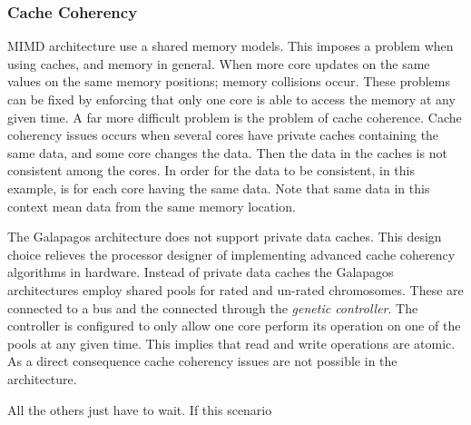 




\subsubsection{Cache Coherency}
MIMD architecture use a shared memory models.
This imposes a problem when using caches, and memory in general.
When more core updates on the same values on the same memory positions; memory collisions occur.
These problems can be fixed by enforcing that only one core is able to access the memory at any given time.
A far more difficult problem is the problem of cache coherence.
Cache coherency issues occurs when several cores have private caches containing the same data, and some core changes the data.
Then the data in the caches is not consistent among the cores.
In order for the data to be consistent, in this example, is for each core having the same data.
Note that same data in this context mean data from the same memory location.


The Galapagos architecture does not support private data caches.
This design choice relieves the processor designer of implementing advanced cache coherency algorithms in hardware.
Instead of private data caches the Galapagos architectures employ shared pools for rated and un-rated chromosomes.
These are connected to a bus and the connected through the \emph{genetic controller}.
The controller is configured to only allow one core perform its operation on one of the pools at any given time.
This implies that read and write operations are atomic.
As a direct consequence cache coherency issues are not possible in the architecture.







All the others just have to wait.
If this scenario 









\section{}
